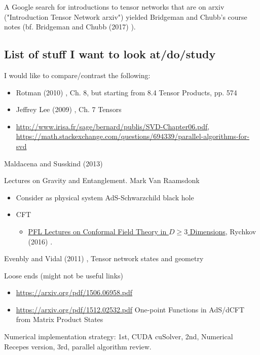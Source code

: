 \documentclass[10pt]{amsart}
\begin{document}
\begin{multicols*}{2}
A Google search for introductions to tensor networks that are on arxiv ("Introduction Tensor Network arxiv") yielded Bridgeman and Chubb's course notes (bf. Bridgeman and Chubb (2017) \cite{BrCh2017}).    

\subsection{List of stuff I want to look at/do/study}  
I would like to compare/contrast the following:  
\begin{itemize}
\item Rotman (2010) \cite{JRotman2010}, Ch. 8, but starting from 8.4 Tensor Products, pp. 574  
\item Jeffrey Lee (2009) \cite{JLee2009}, Ch. 7 Tensors 
\item \url{http://www.irisa.fr/sage/bernard/publis/SVD-Chapter06.pdf}, \url{https://math.stackexchange.com/questions/694339/parallel-algorithms-for-svd}
\end{itemize}



Maldacena and Susskind (2013) \cite{MaSu2013}  

Lectures on Gravity and Entanglement.  Mark Van Raamsdonk  \cite{Raam2016}

\begin{itemize}
\item Consider as physical system AdS-Schwarzchild black hole   
\item CFT 
\begin{itemize}
\item \href{https://arxiv.org/pdf/1601.05000.pdf}{PFL Lectures on Conformal Field Theory in $D\geq 3$ Dimensions}, Rychkov (2016) \cite{Rych2016}.  
\end{itemize}
\end{itemize}

Evenbly and Vidal (2011) \cite{EvVi2011}, Tensor network states and geometry

Loose ends (might not be useful links)
\begin{itemize}
\item \url{https://arxiv.org/pdf/1506.06958.pdf}
\item \url{https://arxiv.org/pdf/1512.02532.pdf} One-point Functions in AdS/dCFT from Matrix Product States
\end{itemize}

Numerical implementation strategy: 1st, CUDA cuSolver, 2nd, Numerical Recepes version, 3rd, parallel algorithm review.



\end{multicols*}
\end{document}
